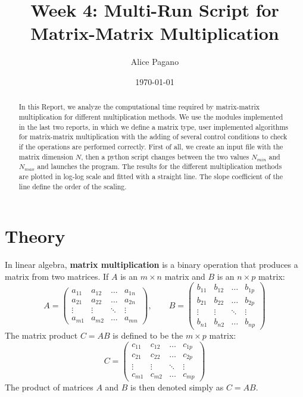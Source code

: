 \documentclass[rmp,10pt,onecolumn,fleqn,notitlepage]{revtex4-1}
\begin{document}
\title{Week 4: Multi-Run Script for Matrix-Matrix Multiplication}
\author{Alice Pagano}
\date{\today}

\begin{abstract}
In this Report, we analyze the computational time required by matrix-matrix multiplication for different multiplication methods. We use the modules implemented in the last two reports, in which we define a matrix type, user implemented algorithms for matrix-matrix multiplication with the adding of several control conditions to check if the operations are performed correctly. First of all, we create an input file with the matrix dimension \( N \), then a python script changes between the two values \( N_{min} \) and \( N_{max} \) and launches the program.  The results for the different multiplication methods are plotted in log-log scale and fitted with a straight line. The slope coefficient of the line define the order of the scaling.
\end{abstract}

\maketitle


\section{Theory}
In linear algebra, \textbf{matrix multiplication} is a binary operation that produces a matrix from two matrices.
If $A$ is an $m \times n$ matrix and $B$ is an $n \times p$ matrix:
\begin{equation}
    A =
  \begin{pmatrix}
     a_{11} & a_{12} & \dots  & a_{1n} \\
     a_{21} & a_{22} & \dots  & a_{2n} \\
     \vdots & \vdots & \ddots & \vdots \\
     a_{m1} & a_{m2} & \dots  & a_{mn}
  \end{pmatrix}, \qquad
  B =
\begin{pmatrix}
   b_{11} & b_{12} & \dots  & b_{1p} \\
   b_{21} & b_{22} & \dots  & b_{2p} \\
   \vdots & \vdots & \ddots & \vdots \\
   b_{n1} & b_{n2} & \dots  & b_{np}
\end{pmatrix}
\end{equation}
The matrix product $C = AB$ is defined to be the $m \times p$ matrix:
\begin{equation}
    C =
  \begin{pmatrix}
     c_{11} & c_{12} & \dots  & c_{1p} \\
     c_{21} & c_{22} & \dots  & c_{2p} \\
     \vdots & \vdots & \ddots & \vdots \\
     c_{m1} & c_{m2} & \dots  & c_{mp}
  \end{pmatrix}
\end{equation}
The product of matrices $A$ and $B$ is then denoted simply as \( C = AB \).
\end{document}

